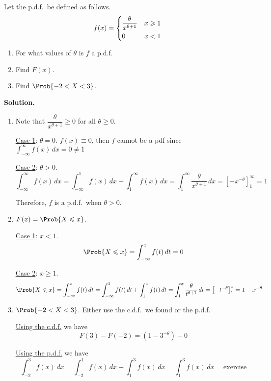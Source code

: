 \begin{Example}{}{}
    Let the p.d.f.\ be defined as follows.
    \[ f(x)=\begin{dcases}
            \frac{\theta}{x^{\theta+1}} & x\geqslant 1 \\
            0                           & x<1
        \end{dcases} \]
    \begin{enumerate}[label=(\roman*)]
        \item For what values of $ \theta $ is $ f $ a p.d.f.
        \item Find $ F(x) $.
        \item Find $ \Prob{-2<X<3} $.
    \end{enumerate}
    \textbf{Solution.}

    \begin{enumerate}[label=(\roman*)]
        \item Note that $ \dfrac{\theta}{x^{\theta+1}} \geqslant 0 $
              for all $ \theta\geqslant 0 $.

              \underline{Case 1}: $ \theta=0 $. $ f(x)\equiv 0 $, then $ f $
              cannot be a pdf since $ \int_{-\infty}^{\infty} f(x)\, d{x}=0\neq 1 $

              \underline{Case 2}: $ \theta>0 $.
              \[ \int_{-\infty}^{\infty} f(x)\, d{x}=\int_{-\infty}^{1} f(x)\, d{x}
                  +\int_{1}^{\infty} f(x)\, d{x}=\int_{1}^{\infty} \frac{\theta}{x^{\theta+1}}\, d{x}
                  =\left[ -x^{-\theta} \right]_1^\infty=1 \]

              Therefore, $ f $ is a p.d.f.\ when $ \theta>0 $.

        \item $ F(x)=\Prob{X\leqslant x} $.

              \underline{Case 1}: $ x<1 $.
              \[ \Prob{X\leqslant x}=\int_{-\infty}^{x} f(t)\, d{t} =0 \]

              \underline{Case 2}:  $ x\geqslant 1 $.
              \[ \Prob{X\leqslant x}=\int_{-\infty}^{x} f(t)\, d{t}
                  =\int_{-\infty}^{1} f(t)\, d{t} +\int_{1}^{x} f(t)\, d{t}
                  =\int_{1}^{x} \frac{\theta}{t^{\theta+1}} \, d{t}=\left[ -t^{-\theta} \right]_1^x=
                  1-x^{-\theta}  \]
        \item $ \Prob{-2<X<3} $. Either use the c.d.f.\ we found or the p.d.f.

              \underline{Using the c.d.f.} we have
              \[ F(3)-F(-2)=(1-3^{-\theta})-0 \]

              \underline{Using the p.d.f.} we have
              \[ \int_{-2}^{3} f(x)\, d{x}=
                  \int_{-2}^{1} f(x)\, d{x} +\int_{1}^{3} f(x)\, d{x}
                  =\int_{1}^{3} f(x)\, d{x}=\text{exercise} \]
    \end{enumerate}

\end{Example}
